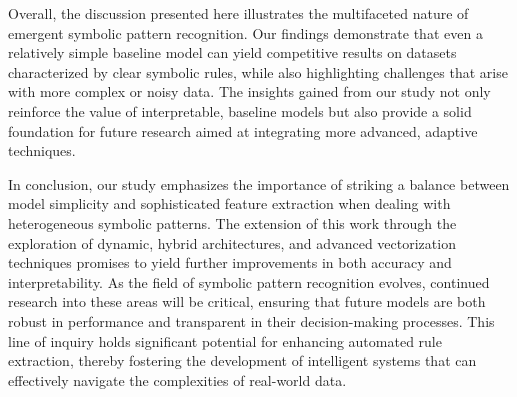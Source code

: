 \documentclass{article}
\begin{document}
Overall, the discussion presented here illustrates the multifaceted nature of emergent symbolic pattern recognition. Our findings demonstrate that even a relatively simple baseline model can yield competitive results on datasets characterized by clear symbolic rules, while also highlighting challenges that arise with more complex or noisy data. The insights gained from our study not only reinforce the value of interpretable, baseline models but also provide a solid foundation for future research aimed at integrating more advanced, adaptive techniques.

In conclusion, our study emphasizes the importance of striking a balance between model simplicity and sophisticated feature extraction when dealing with heterogeneous symbolic patterns. The extension of this work through the exploration of dynamic, hybrid architectures, and advanced vectorization techniques promises to yield further improvements in both accuracy and interpretability. As the field of symbolic pattern recognition evolves, continued research into these areas will be critical, ensuring that future models are both robust in performance and transparent in their decision-making processes. This line of inquiry holds significant potential for enhancing automated rule extraction, thereby fostering the development of intelligent systems that can effectively navigate the complexities of real-world data.
\end{document}
